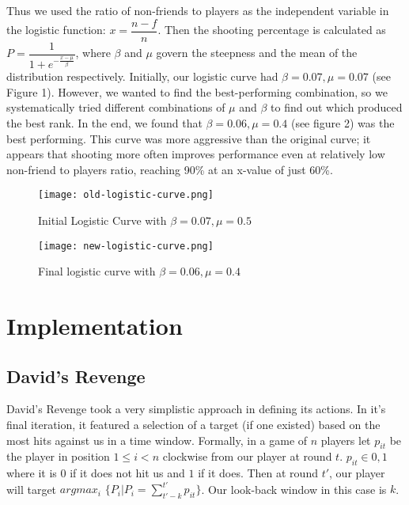 \documentclass[
10pt, %
letterpaper, %
oneside, %
headinclude,footinclude, %
english
]{article}
\begin{document}
Thus we used the ratio of non-friends to players as the independent variable in the logistic function: $x = \dfrac{n - f}{n}$. Then the shooting percentage is calculated as $P = \dfrac{1}{1 + e^{-\frac{x - \mu}{\beta}}}$, where $\beta$ and $\mu$ govern the steepness and the mean of the distribution respectively. Initially, our logistic curve had $\beta=0.07,\mu=0.07$ (see Figure 1). However, we wanted to find the best-performing combination, so we systematically tried different combinations of $\mu$ and $\beta$ to find out which produced the best rank. In the end, we found that $\beta=0.06,\mu=0.4$ (see figure 2) was the best performing. This curve was more aggressive than the original curve; it appears that shooting more often improves performance even at relatively low non-friend to players ratio, reaching 90\% at an x-value of just 60\%.

\begin{figure}[h]
\centering
\texttt{[image: old-logistic-curve.png]}
\caption[Initial logistic curve with $\beta=0.07,\mu=0.5$]{Initial Logistic Curve with $\beta=0.07,\mu=0.5$}
\label{fig:gallery2}
\end{figure}

\begin{figure}[h]
\centering
\texttt{[image: new-logistic-curve.png]}
\caption[Final logistic curve with $\beta=0.06,\mu=0.4$]{Final logistic curve with $\beta=0.06,\mu=0.4$}
\label{fig:gallery3}
\end{figure}
\section{Implementation}

\subsection{David's Revenge}

David's Revenge took a very simplistic approach in defining its actions. In it's final iteration, it featured a selection of a target (if one existed) based on the most hits against us in a time window. Formally, in a game of $n$ players let $p_{it}$ be the player in position $1\le i<n$ clockwise from our player at round $t$. $p_{it} \in {0,1}$ where it is $0$ if it does not hit us and $1$ if it does. Then at round $t'$, our player will target $argmax_i$ $\{P_i | P_i = \sum_{t'-k}^{t'}p_{it}\}$. Our look-back window in this case is $k$. 
\end{document}
